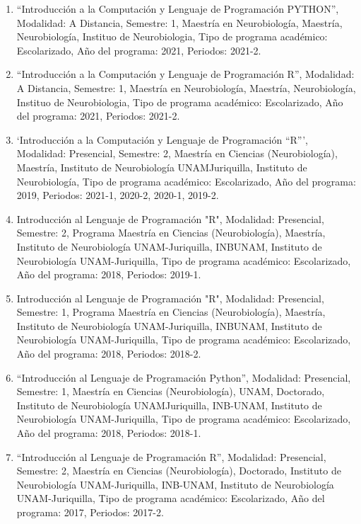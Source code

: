 \begin{enumerate}
\item “Introducción a la Computación y Lenguaje de Programación PYTHON”, Modalidad: A Distancia, Semestre: 1, Maestría en 
Neurobiología, Maestría, Neurobiología, Instituo de Neurobiologia, Tipo de programa académico: Escolarizado, Año del 
programa: 2021, Periodos: 2021-2.

\item “Introducción a la Computación y Lenguaje de Programación R”, Modalidad: A Distancia, Semestre: 1, Maestría en 
Neurobiología, Maestría, Neurobiología, Instituo de Neurobiologia, Tipo de programa académico: Escolarizado, Año del 
programa: 2021, Periodos: 2021-2.

\item ‘Introducción a la Computación y Lenguaje de Programación “R”’, Modalidad: Presencial, Semestre: 2, Maestría en 
Ciencias 
(Neurobiología), Maestría, Instituto de Neurobiología UNAMJuriquilla, Instituto de Neurobiología, Tipo de programa académico: 
Escolarizado, Año del programa: 2019, Periodos: 2021-1, 2020-2, 2020-1, 2019-2.

\item Introducción al Lenguaje de Programación "R", Modalidad: Presencial, Semestre: 2, Programa Maestría en Ciencias 
(Neurobiología), Maestría, Instituto de Neurobiología UNAM-Juriquilla, INBUNAM, Instituto de Neurobiología UNAM-Juriquilla, 
Tipo de programa académico: Escolarizado, Año del programa: 2018, Periodos: 2019-1.

\item Introducción al Lenguaje de Programación "R", Modalidad: Presencial, Semestre: 1, Programa Maestría en Ciencias 
(Neurobiología), Maestría, Instituto de Neurobiología UNAM-Juriquilla, INBUNAM, Instituto de Neurobiología UNAM-Juriquilla, 
Tipo de programa académico: Escolarizado, Año del programa: 2018, Periodos: 2018-2.

\item “Introducción al Lenguaje de Programación Python”, Modalidad: Presencial, Semestre: 1, Maestría en Ciencias 
(Neurobiología), UNAM, Doctorado, Instituto de Neurobiología UNAMJuriquilla, INB-UNAM, Instituto de Neurobiología 
UNAM-Juriquilla, Tipo de programa académico: Escolarizado, Año del programa: 2018, Periodos: 2018-1.

\item “Introducción al Lenguaje de Programación R”, Modalidad: Presencial, Semestre: 2, Maestría en
Ciencias (Neurobiología), Doctorado, Instituto de Neurobiología UNAM-Juriquilla, INB-UNAM, Instituto de Neurobiología 
UNAM-Juriquilla, Tipo de programa académico: Escolarizado, Año del programa: 2017, Periodos: 2017-2.


\end{enumerate}
